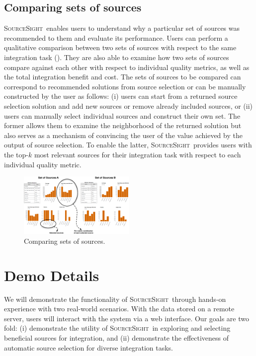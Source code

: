 \documentclass{sig-alternate-05-2015}
\newcommand\system{\textsc{SourceSight}}
\begin{document}
\subsection{Comparing sets of sources}
\label{sec:extensions}
\system~enables users to understand why a particular set of sources was recommended to them and evaluate its performance. Users can perform a qualitative comparison between two sets of sources with respect to the same integration task (). They are also able to examine how two sets of sources compare against each other with respect to individual quality metrics, as well as the total integration benefit and cost. The sets of sources to be compared can correspond to recommended solutions from source selection or can be manually constructed by the user as follows: (i) users can start from a returned source selection solution and add new sources or remove already included sources, or (ii) users can manually select individual sources and construct their own set. The former allows them to examine the neighborhood of the returned solution but also serves as a mechanism of convincing the user of the value achieved by the output of source selection. To enable the latter, \system~provides users with the top-$k$ most relevant sources for their integration task with respect to each individual quality metric.
\begin{figure}
	\begin{center}
	\includegraphics[trim=0 0 0 0, clip,width=0.5\textwidth]{fig/compSS}
	\vspace{-20pt}
	\caption{Comparing sets of sources.}
	\label{fig:comparison}
	\vspace{-25pt}
	\end{center}
\end{figure}

\vspace{-5pt}
\section{Demo Details}
\label{sec:details}
We will demonstrate the functionality of \system~through hands-on experience with two real-world scenarios. With the data stored on a remote server, users will interact with the system via a web interface. Our goals are two fold: (i) demonstrate the utility of \system~in exploring and selecting beneficial sources for integration, and (ii) demonstrate the effectiveness of automatic source selection for diverse integration tasks. 
\end{document}
